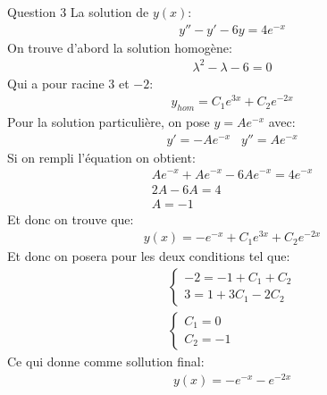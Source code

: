 \begin{parag}{Question 3}
    La solution de $y\left(x\right)$:
    \begin{align*} y'' - y' - 6y = 4e^{-x}
    \end{align*}
    On trouve d'abord la solution homogène:
    \begin{align*} \lambda^2 - \lambda - 6 = 0 \end{align*}
    Qui a pour racine $3$ et $-2$:
    \begin{align*} y_{hom} = C_1e^{3x} + C_2e^{-2x} \end{align*}
    Pour la solution particulière, on pose $y = Ae^{-x}$ avec:\\
    \begin{align*} y' = -Ae^{-x}\;\;\; y'' = Ae^{-x} \end{align*} 
    Si on rempli l'équation on obtient:
    \begin{align*} Ae^{-x} + Ae^{-x} -6Ae^{-x} = 4e^{-x}\\
    2A - 6A = 4\\
    A = -1
\end{align*}
Et donc on trouve que:
\begin{align*} y\left(x\right) = -e^{-x} + C_1e^{3x} + C_2e^{-2x} \end{align*}
Et donc on posera pour les deux conditions tel que:
\begin{align*} 
    \begin{cases}
        -2 = -1 + C_1 + C_2\\
        3 = 1 + 3C_1 - 2C_2
    \end{cases}
   \\
   \begin{cases}
       C_1 = 0\\
       C_2 = -1
   \end{cases}
\end{align*}
Ce qui donne comme sollution final:
\begin{align*} y\left(x\right) = -e^{-x} - e^{-2x} \end{align*}
\end{parag}



